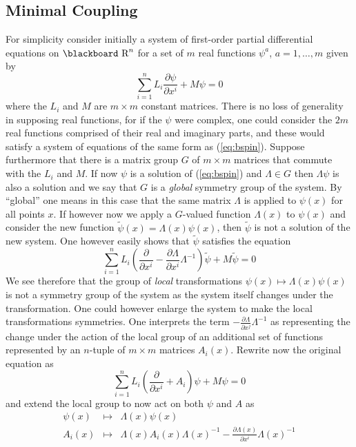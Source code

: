 \documentclass[12pt,titlepage]{article}
\def\bbf#1{\hbox{\blackboard #1}}
\def\lR{\bbf R}
\def\ppv#1#2{\frac{\partial}{\partial #1^#2}}
\begin{document}
\subsection{Minimal Coupling}\label{sec:mincoup}%
For simplicity consider initially a system of first-order partial
differential equations on \(\lR^n\) for a set of \(m\) real functions
\(\psi^a\), \(a=1,\dots,m\) given by
\begin{equation}\label{eq:bspin}%
\sum_{i=1}^n L_i\frac{\partial\psi}{\partial x^i} +M\psi = 0
\end{equation}%
where the \(L_i\) and \(M\) are \(m\times m\) constant matrices.
There is no loss of generality in supposing real functions, for if the
\(\psi\) were complex, one could consider the \(2m\) real functions
comprised of their real and imaginary parts, and these would satisfy
a system of equations of the same form as (\ref{eq:bspin}). Suppose
furthermore that there is a matrix group \(G\) of \(m\times m\) matrices
that commute with the \(L_i\) and \(M\). If now \(\psi\) is a solution
of (\ref{eq:bspin}) and \(\Lambda \in G\) then \(\Lambda\psi\) is also a
solution and we say that \(G\) is a {\em global\/}
%
 symmetry group of the
system. By ``global'' one means in this case that the same matrix
\(\Lambda\) is applied to \(\psi(x)\) for all points \(x\).  If however
now we apply a \(G\)-valued function \(\Lambda(x)\) to \(\psi(x)\) and
consider the new function \(\tilde\psi(x)=\Lambda(x)\psi(x)\), then
\(\tilde\psi\) is not a solution of the new system. One however
easily shows  that \(\tilde\psi\) satisfies the equation
\[%
\sum_{i=1}^n L_i(\ppv{x}{i}
-\frac{\partial\Lambda}{\partial x^i}\Lambda^{-1})\tilde\psi
+M\tilde\psi = 0
\]%
We see therefore that the group of {\em local\/} 
%
transformations
\(\psi(x)\mapsto\Lambda(x)\psi(x)\) is not a symmetry group of the system
as the system itself changes under the transformation. One could however
enlarge the system to make the local transformations symmetries. One
interprets the term \(-\frac{\partial\Lambda}{\partial x^j}\Lambda^{-1}\) as
representing the change under the action of the local  group
of an additional
set of functions represented by an  \(n\)-tuple  of \(m\times m\)
matrices \(A_i(x)\). Rewrite now the original equation as
\begin{equation}\label{eq:agspin}%
\sum_{i=1}^n L_i(\ppv{x}{i}+A_i)\psi +M\psi = 0
\end{equation}%
and extend the local group  to now act on both \(\psi\) and \(A\) as
\begin{eqnarray}%
\psi(x) &\mapsto & \Lambda(x)\psi(x)\\ \label{eq:urgauge}
A_i(x) &\mapsto &\Lambda(x) A_i(x) \Lambda(x)^{-1} -
\frac{\partial\Lambda(x)}{\partial x^i}\Lambda(x)^{-1}
\end{eqnarray}%
\end{document}
